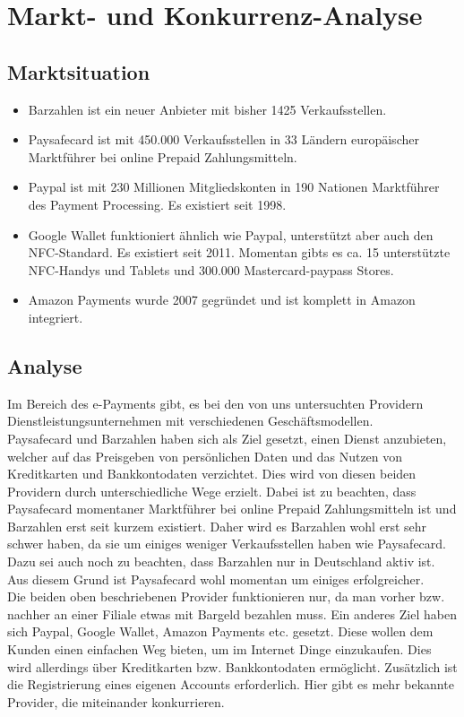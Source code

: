 \section{Markt- und Konkurrenz-Analyse}

\subsection{Marktsituation}
\begin{itemize}
\item Barzahlen ist ein neuer Anbieter mit bisher 1425 Verkaufsstellen.
\item Paysafecard ist mit 450.000 Verkaufsstellen in 33 Ländern europäischer Marktführer bei online Prepaid Zahlungsmitteln.
\item Paypal ist mit 230 Millionen Mitgliedskonten in 190 Nationen Marktführer des Payment Processing. Es existiert seit 1998.
\item Google Wallet funktioniert ähnlich wie Paypal, unterstützt aber auch den NFC-Standard. Es existiert seit 2011. Momentan gibts es ca. 15 unterstützte NFC-Handys und Tablets und 300.000 Mastercard-paypass Stores.
\item Amazon Payments wurde 2007 gegründet und ist komplett in Amazon integriert.
\end{itemize}

\subsection{Analyse}
Im Bereich des e-Payments gibt, es bei den von uns untersuchten Providern Dienstleistungsunternehmen mit verschiedenen Geschäftsmodellen.\\

Paysafecard und Barzahlen haben sich als Ziel gesetzt, einen Dienst anzubieten, welcher auf das Preisgeben von persönlichen Daten und das Nutzen von Kreditkarten und Bankkontodaten verzichtet. Dies wird von diesen beiden Providern durch unterschiedliche Wege erzielt. Dabei ist zu beachten, dass Paysafecard momentaner Marktführer bei online Prepaid Zahlungsmitteln ist und Barzahlen erst seit kurzem existiert. Daher wird es Barzahlen wohl erst sehr schwer haben, da sie um einiges weniger Verkaufsstellen haben wie Paysafecard. Dazu sei auch noch zu beachten, dass Barzahlen nur in Deutschland aktiv ist. Aus diesem Grund ist Paysafecard wohl momentan um einiges erfolgreicher.\\

Die beiden oben beschriebenen Provider funktionieren nur, da man vorher bzw. nachher an einer Filiale etwas mit Bargeld bezahlen muss. Ein anderes Ziel haben sich Paypal, Google Wallet, Amazon Payments etc. gesetzt. Diese wollen dem Kunden einen einfachen Weg bieten, um im Internet Dinge einzukaufen. Dies wird allerdings über Kreditkarten bzw. Bankkontodaten ermöglicht. Zusätzlich ist die Registrierung eines eigenen Accounts erforderlich. Hier gibt es mehr bekannte Provider, die miteinander konkurrieren.\\

